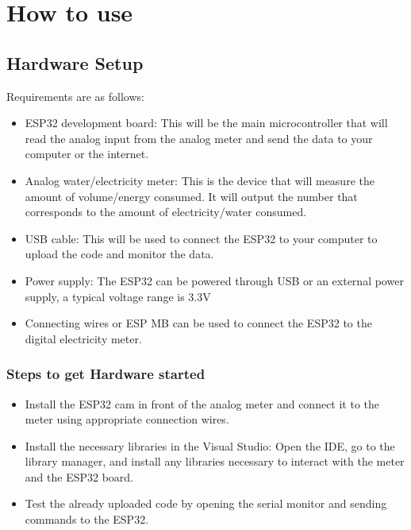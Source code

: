 %
%
%
%


\chapter{How to use}

\section{Hardware Setup}
Requirements are as follows:
\begin{itemize}
	\item ESP32 development board: This will be the main microcontroller that will read the analog input from the analog meter and send the data to your computer or the internet.
	\item Analog water/electricity meter: This is the device that will measure the amount of volume/energy consumed. It will output the number that corresponds to the amount of electricity/water consumed.
	\item USB cable: This will be used to connect the ESP32 to your computer to upload the code and monitor the data.
	\item Power supply: The ESP32 can be powered through USB or an external power supply, a typical voltage range is 3.3V
	\item Connecting wires or ESP MB can be used to connect the ESP32 to the digital electricity meter.
\end{itemize}

\subsection{Steps to get Hardware started}
\begin{itemize}
	\item Install the ESP32 cam in front of the analog meter and connect it to the meter using appropriate connection wires.
	\item Install the necessary libraries in the Visual Studio: Open the IDE, go to the library manager, and install any libraries necessary to interact with the meter and the ESP32 board.
	\item Test the already uploaded code by opening the serial monitor and sending commands to the ESP32.
\end{itemize}

